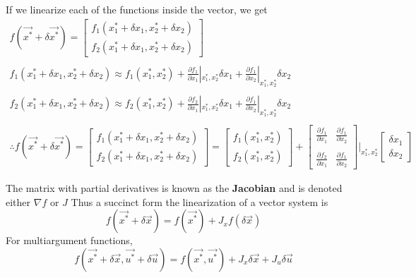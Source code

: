 \documentclass{article}
\begin{document}
If we linearize each of the functions inside the vector, we get
\[
    \begin{array}{c}
        f(\vec{x^*}+\delta\vec{x^*})=\left[
            \begin{array}{c}
                f_1(x_1^*+\delta x_1, x_2^*+\delta x_2)\\
                f_2(x_1^*+\delta x_1, x_2^*+\delta x_2)
            \end{array}
        \right] \\\\
        f_1(x_1^*+\delta x_1, x_2^*+\delta x_2) \approx f_1(x_1^*, x_2^*)+\frac{\partial f_1}{\partial x_1}|_{x_1^*, x_2^*}\delta x_1+\frac{\partial f_1}{\partial x_2}|_{x_1^*, x_2^*}\delta x_2\\\\
        f_2(x_1^*+\delta x_1, x_2^*+\delta x_2) \approx f_2(x_1^*, x_2^*)+\frac{\partial f_2}{\partial x_1}|_{x_1^*, x_2^*}\delta x_1+\frac{\partial f_1}{\partial x_2}|_{x_1^*, x_2^*}\delta x_2\\\\
        \therefore f(\vec{x^*}+\delta\vec{x^*})=\left[
            \begin{array}{c}
                f_1(x_1^*+\delta x_1, x_2^*+\delta x_2)\\
                f_2(x_1^*+\delta x_1, x_2^*+\delta x_2)
            \end{array}
        \right] = \left[
            \begin{array}{c}
                f_1(x_1^*, x_2^*)\\
                f_2(x_1^*, x_2^*)
            \end{array}
            \right] + \left[
                \begin{array}{cc}
                    \frac{\partial f_1}{\partial x_1} & \frac{\partial f_1}{\partial x_2} \\\\
                    \frac{\partial f_2}{\partial x_1} & \frac{\partial f_1}{\partial x_2}
                \end{array}
                \right] |_{x_1^*, x_2^*} \left[
                    \begin{array}{c}
                        \delta x_1\\
                        \delta x_2
                    \end{array}
                    \right]
    \end{array}
\]

The matrix with partial derivatives is known as the \textbf{Jacobian} and is denoted either $\nabla f$ or $J$
Thus a succinct form the linearization of a vector system is
$$ f(\vec{x^*}+\delta\vec{x})=f(\vec{x^*})+J_x f (\delta \vec{x})$$
For multiargument functions,
$$ f(\vec{x^*}+\delta\vec{x}, \vec{u^*}+\delta \vec{u})=f(\vec{x^*}, \vec{u^*})+J_x \delta \vec{x}+J_u \delta \vec{u}$$
\end{document}
